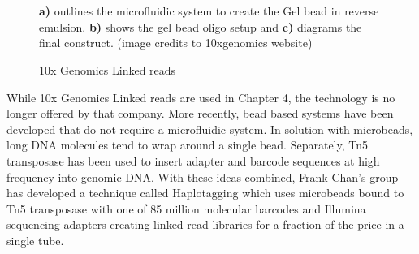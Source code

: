 \begin{figure}[htbp!]

\caption{10x Genomics Linked reads}
\label{figure:linkedreads}
\begin{centering}
 \\
 \\
\par{\textbf{a)} outlines the microfluidic system to create the Gel bead in reverse emulsion. \textbf{b)} shows the gel bead oligo setup and \textbf{c)} diagrams the final construct. (image credits to 10xgenomics website)}
\end{centering}
\end{figure}

\par{
While 10x Genomics Linked reads are used in Chapter 4, the technology is no longer offered by that company. More recently, bead based systems have been developed that do not require a microfluidic system. In solution with microbeads, long DNA molecules tend to wrap around a single bead\cite{beadphasing}\cite{LFR}. Separately, Tn5 transposase has been used to insert adapter and barcode sequences at high frequency into genomic DNA\cite{cptseq}. With these ideas combined, Frank Chan's group has developed a technique called Haplotagging which uses microbeads bound to Tn5 transposase with one of 85 million molecular barcodes and Illumina sequencing adapters creating linked read libraries for a fraction of the price in a single tube\cite{haplotagging}.
}

